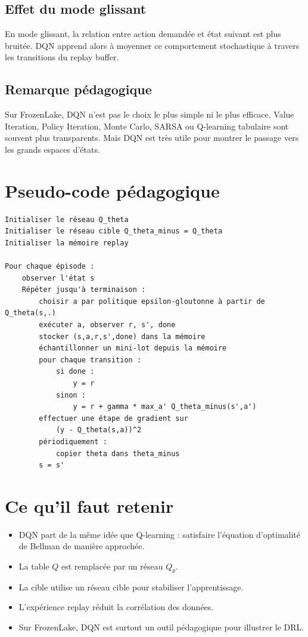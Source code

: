 \documentclass[11pt,a4paper]{article}
\begin{document}
\subsection{Effet du mode glissant}

En mode glissant, la relation entre action demandée et état suivant est plus bruitée. DQN apprend alors à moyenner ce comportement stochastique à travers les transitions du replay buffer.

\subsection{Remarque pédagogique}

Sur FrozenLake, DQN n'est pas le choix le plus simple ni le plus efficace. Value Iteration, Policy Iteration, Monte Carlo, SARSA ou Q-learning tabulaire sont souvent plus transparents. Mais DQN est très utile pour montrer le passage vers les grands espaces d'états.

\section{Pseudo-code pédagogique}

\begin{verbatim}
Initialiser le réseau Q_theta
Initialiser le réseau cible Q_theta_minus = Q_theta
Initialiser la mémoire replay

Pour chaque épisode :
    observer l'état s
    Répéter jusqu'à terminaison :
        choisir a par politique epsilon-gloutonne à partir de Q_theta(s,.)
        exécuter a, observer r, s', done
        stocker (s,a,r,s',done) dans la mémoire
        échantillonner un mini-lot depuis la mémoire
        pour chaque transition :
            si done :
                y = r
            sinon :
                y = r + gamma * max_a' Q_theta_minus(s',a')
        effectuer une étape de gradient sur
            (y - Q_theta(s,a))^2
        périodiquement :
            copier theta dans theta_minus
        s = s'
\end{verbatim}

\section{Ce qu'il faut retenir}

\begin{itemize}[leftmargin=1.6em]
    \item DQN part de la même idée que Q-learning : satisfaire l'équation d'optimalité de Bellman de manière approchée.
    \item La table $Q$ est remplacée par un réseau $Q_{\theta}$.
    \item La cible utilise un réseau cible pour stabiliser l'apprentissage.
    \item L'expérience replay réduit la corrélation des données.
    \item Sur FrozenLake, DQN est surtout un outil pédagogique pour illustrer le DRL.
\end{itemize}
\end{document}

